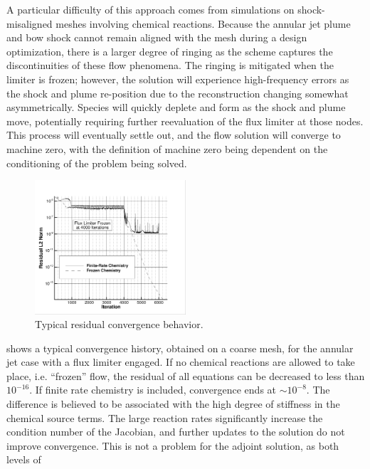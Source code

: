 A particular difficulty of this approach comes from simulations on
shock-misaligned meshes involving chemical reactions.  Because the annular jet
plume and bow shock cannot remain aligned with the mesh during a design
optimization, there is a larger degree of ringing as the scheme captures the
discontinuities of these flow phenomena.  The ringing is mitigated when the
limiter is frozen; however, the solution will experience high-frequency errors
as the shock and plume re-position due to the reconstruction changing somewhat
asymmetrically.  Species will quickly deplete and form as the shock and plume
move, potentially requiring further reevaluation of the flux limiter at those
nodes.  This process will eventually settle out, and the flow solution will
converge to machine zero, with the definition of machine zero being dependent on
the conditioning of the problem being solved.  
\begin{figure}[h]
  \centering
  \includegraphics[width=0.5\textwidth]{figures/limiters/chem-res-comp.png}
  \caption{Typical residual convergence behavior.}
  \label{fig:chem-res-comp}
\end{figure}
 shows a typical convergence history, obtained on a
coarse mesh, for the annular jet case with a flux limiter engaged.  If no
chemical reactions are allowed to take place, i.e. ``frozen'' flow, the residual
of all equations can be decreased to less than $10^{-16}$.  If finite rate
chemistry is included, convergence ends at $\sim 10^{-8}$.  The difference is
believed to be associated with the high degree of stiffness in the chemical
source terms.  The large reaction rates significantly increase the condition
number of the Jacobian, and further updates to the solution do not improve
convergence.  This is not a problem for the adjoint solution, as both levels of
